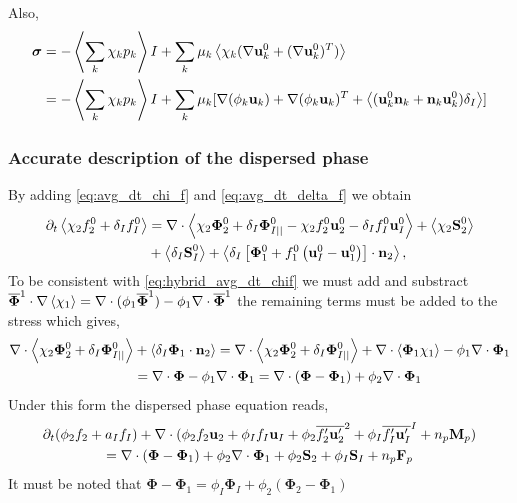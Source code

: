 Also, 
\begin{align*}
    \bm{\sigma}
    &= -\left<\sum_k \chi_k p_k\right> I + \sum_k\mu_k \left<\chi_k  (\mathbf{\nabla}\textbf{u}_k^0+(\mathbf{\nabla}\textbf{u}_k^0)^T)\right>\\
    &= -\left<\sum_k \chi_k p_k\right> I + \sum_k\mu_k [\nabla (\phi_k\textbf{u}_k)+ \mathbf{\nabla} (\phi_k\textbf{u}_k)^T
    + \left<(\textbf{u}_k^0  \textbf{n}_k +  \textbf{n}_k\textbf{u}_k^0)\delta_I\right>]
\end{align*}

\subsubsection{Accurate description of the dispersed phase}


By adding \ref{eq:avg_dt_chi_f} and \ref{eq:avg_dt_delta_f} we obtain 
\begin{align*}
    \partial_t \left<\chi_2 f_2^0 +\delta_If_I^0\right>
    &= \mathbf{\nabla}\cdot \left<\chi_2 \mathbf{\Phi}_2^0 + \delta_I \mathbf{\Phi}_{I||}^0 - \chi_2 f_2^0 \textbf{u}_2^0 - \delta_I f_I^0 \textbf{u}_I^0\right>
    + \left<\chi_2 \textbf{S}_2^0 \right>\\
    &+ \left<\delta_I\textbf{S}_I^0\right> 
    + \left<\delta_I\left[
        \mathbf{\Phi}_1^0
        + f_1^0
        \left(
            \textbf{u}_I^0
            - \textbf{u}_1^0
        \right)
    \right]
    \cdot \textbf{n}_2\right>,
\end{align*}
To be consistent with \ref{eq:hybrid_avg_dt_chif} we must add and substract $\overline{\mathbf{\Phi}}^1\cdot\mathbf{\nabla} \left<\chi_1\right> = \mathbf{\nabla}\cdot  (\phi_1 \overline{\mathbf{\Phi}}^1) - \phi_1 \mathbf{\nabla}\cdot \overline{\mathbf{\Phi}}^1$ the remaining terms must be added to the stress which gives,
\begin{align*}
    \mathbf{\nabla}\cdot \left<\chi_2 \mathbf{\Phi}_2^0 + \delta_I \mathbf{\Phi}_{I||}^0\right>
    & + \left<\delta_I \bm{\Phi}_1 \cdot \textbf{n}_2\right>
    =
    \mathbf{\nabla}\cdot \left<\chi_2 \mathbf{\Phi}_2^0 + \delta_I \mathbf{\Phi}_{I||}^0\right>
    + \mathbf{\nabla}\cdot \left<\bm{\Phi}_1 \chi_1\right> 
     - \phi_1 \mathbf{\nabla}\cdot \bm{\Phi}_1\\
    &= \mathbf{\nabla}\cdot \bm{\Phi}
     - \phi_1 \mathbf{\nabla}\cdot \bm{\Phi}_1
     =  \mathbf{\nabla}\cdot (\bm{\Phi} - \bm{\Phi}_1)
     + \phi_2 \mathbf{\nabla}\cdot \bm{\Phi}_1\\
\end{align*}
Under this form the dispersed phase equation reads, 
\begin{multline*}
    \partial_t (\phi_2 f_2 +a_If_I)
    + \mathbf{\nabla}\cdot (
        \phi_2 f_2 \textbf{u}_2
        + \phi_I f_I \textbf{u}_I
        + \phi_2 \overline{f_2'\textbf{u}_2'}^2 
        + \phi_I \overline{f_I'\textbf{u}_I'}^I
        + n_p \textbf{M}_p 
        )\\
    = 
    \mathbf{\nabla}\cdot (\mathbf{\Phi}  - \mathbf{\Phi}_1 )
    + \phi_2 \mathbf{\nabla}\cdot \mathbf{\Phi}_1 
    + \phi_2 \textbf{S}_2
    + \phi_I \textbf{S}_I
    + n_p\textbf{F}_p
\end{multline*}
It must be noted that $\mathbf{\Phi}  - \mathbf{\Phi}_1 
= \phi_I\mathbf{\Phi}_I+\phi_2(\mathbf{\Phi}_2  - \mathbf{\Phi}_1) $

